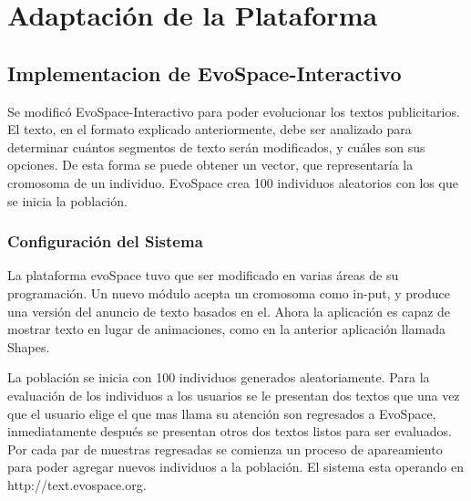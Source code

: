 

\chapter{Adaptación de la Plataforma}


\section{Implementacion de EvoSpace-Interactivo}

Se modificó EvoSpace-Interactivo para poder evolucionar los textos publicitarios. El texto, en el formato explicado anteriormente, debe ser analizado para determinar cuántos segmentos de texto serán modificados, y cuáles son sus opciones. De esta forma se puede obtener un vector, que representaría la cromosoma de un individuo. EvoSpace crea 100 individuos aleatorios con los que se inicia la población. 


\subsection{Configuración del Sistema}

La plataforma evoSpace \cite{romero2014using} tuvo que ser modificado en varias áreas de su programación. Un nuevo módulo acepta un cromosoma como in-put, y produce una versión del anuncio de texto basados en el. Ahora la aplicación es capaz de mostrar texto en lugar de animaciones, como en la anterior aplicación llamada Shapes. 

La población se inicia con 100 individuos generados aleatoriamente. Para la evaluación de los individuos a los usuarios se le presentan dos textos  que una vez que el usuario elige el que mas llama su atención son regresados a EvoSpace, inmediatamente después se presentan otros dos textos listos para ser evaluados. Por cada par de muestras regresadas se comienza un proceso de apareamiento para poder agregar nuevos individuos a la población. El sistema esta operando en http://text.evospace.org.


